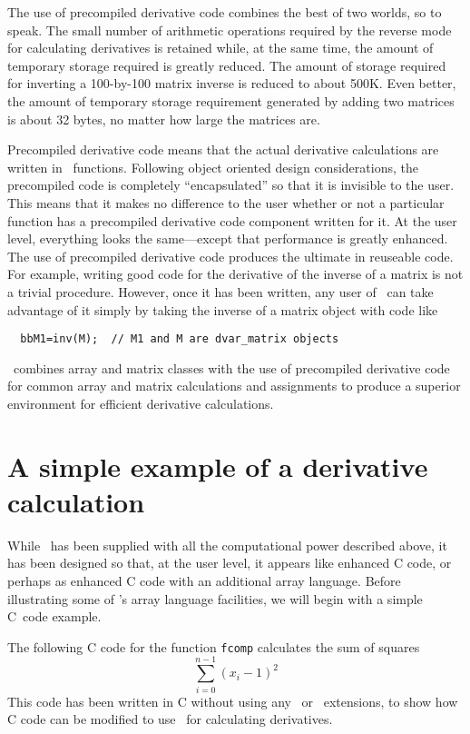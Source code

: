 \documentclass{admbmanual}
\begin{document}
The use of precompiled derivative code combines the best of two
worlds, so to speak. The small number of arithmetic operations
required by the reverse mode for calculating derivatives is
retained while, at the same time,  the amount of temporary storage
required is greatly reduced. The amount of storage required for inverting
a 100-by-100 matrix inverse is reduced to about 500K. Even better,
the amount of temporary storage requirement generated
by adding two matrices is about 32 bytes, no matter how large
the matrices are.

Precompiled derivative code means that the actual derivative 
calculations are written in \cplus\ functions. Following 
object oriented design considerations, the precompiled code is
completely ``encapsulated'' so that it is invisible to
the user. This means that it makes no difference to the user
whether or not a particular function has a precompiled derivative
code component written for it. At the user level, everything looks the
same---except that performance is greatly enhanced.
The use of precompiled derivative code produces the ultimate in reuseable
code. For example, writing good code for the derivative of
the inverse of a matrix is not a trivial procedure.  However, once
it has been written, any user of \scAD\ can take advantage of it simply 
by taking the inverse of a matrix object with code like
\begin{lstlisting}
  bbM1=inv(M);  // M1 and M are dvar_matrix objects
\end{lstlisting}

\scAD\ combines array and matrix classes with the use of precompiled
derivative code for common array and matrix calculations and assignments
to produce a superior environment for efficient derivative calculations.



\section{A simple example of a derivative calculation}

While \scAD\ has been supplied with all the computational power
described above, it has been designed so that, at the user level,
it appears like enhanced C code, or perhaps as enhanced C code with
an additional array language.  Before illustrating some of \scAD's
array language facilities, we will begin with a simple
C~code example.

The following C code for the function \texttt{fcomp}
calculates the sum of squares
\begin{equation*}
  \sum_{i=0}^{n-1} (x_i-1)^2
\end{equation*}
This code has been written in C without using any \cplus\ or \scAD\
extensions, to show how C code can be modified to use \scAD\ for calculating
derivatives.
\end{document}
